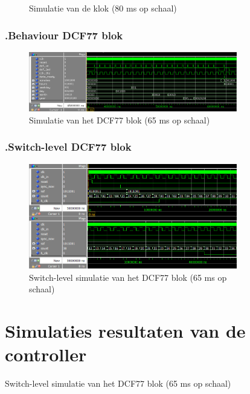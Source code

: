 \begin{figure}[ht!]
\begin{figure}[ht!]
\caption{Simulatie van de klok (80 ms op schaal)}
\end{figure}
\subsection*{\label{fig: beh}\thesubsection.\quad Behaviour DCF77 blok}
\begin{figure}[ht!]
\includegraphics[width=\textwidth,height=\textheight,keepaspectratio]{Figuren/DCF77/Behaviour.png}
\caption{Simulatie van het DCF77 blok (65 ms op schaal)}
\end{figure}
\subsection*{\label{fig: switchlevel}\thesubsection.\quad Switch-level DCF77 blok}
\begin{figure}[ht!]
\includegraphics[width=\textwidth,height=\textheight,keepaspectratio]{Figuren/DCF77/Mod60_teller.png}
\caption{Switch-level simulatie van het DCF77 blok (65 ms op schaal)}
\end{figure}


\chapter[Simulatie resultaten]{Simulaties resultaten van de controller}
\label{Ap:sim_controller}

\end{figure}
